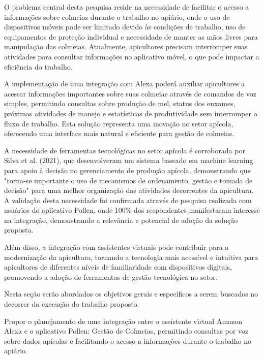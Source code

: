 O problema central desta pesquisa reside na necessidade de facilitar o acesso a informações sobre colmeias durante o trabalho no apiário, 
onde o uso de dispositivos móveis pode ser limitado devido às condições de trabalho, uso de equipamentos de proteção individual 
e necessidade de manter as mãos livres para manipulação das colmeias. Atualmente, apicultores precisam interromper suas atividades 
para consultar informações no aplicativo móvel, o que pode impactar a eficiência do trabalho.

A implementação de uma integração com Alexa poderá auxiliar apicultores a acessar informações importantes sobre suas colmeias 
através de comandos de voz simples, permitindo consultas sobre produção de mel, status dos enxames, próximas atividades de manejo 
e estatísticas de produtividade sem interromper o fluxo de trabalho. Esta solução representa uma inovação no setor apícola, 
oferecendo uma interface mais natural e eficiente para gestão de colmeias. 

A necessidade de ferramentas tecnológicas no setor apícola é corroborada por Silva et al. (2021), que desenvolveram um sistema baseado em 
machine learning para apoio à decisão no gerenciamento de produção apícola, demonstrando que "torna-se importante o uso de mecanismos de 
ordenamento, gestão e tomada de decisão" para uma melhor organização das atividades decorrentes da apicultura. A validação desta necessidade 
foi confirmada através de pesquisa realizada com usuários do aplicativo Pollen, onde 100\% dos respondentes manifestaram interesse na integração, 
demonstrando a relevância e potencial de adoção da solução proposta.

Além disso, a integração com assistentes virtuais pode contribuir para a modernização da apicultura, 
tornando a tecnologia mais acessível e intuitiva para apicultores de diferentes níveis de familiaridade com dispositivos digitais, 
promovendo a adoção de ferramentas de gestão tecnológica no setor.



\label{sec:objetivos}
Nesta seção serão abordados os objetivos gerais e específicos a serem buscados no decorrer da execução do trabalho proposto.

\label{ssec:objetivo-geral}

Propor o planejamento de uma integração entre o assistente virtual Amazon Alexa e o aplicativo Pollen: Gestão de Colmeias, permitindo consultas por voz sobre dados apícolas e facilitando o acesso a informações durante o trabalho no apiário.

